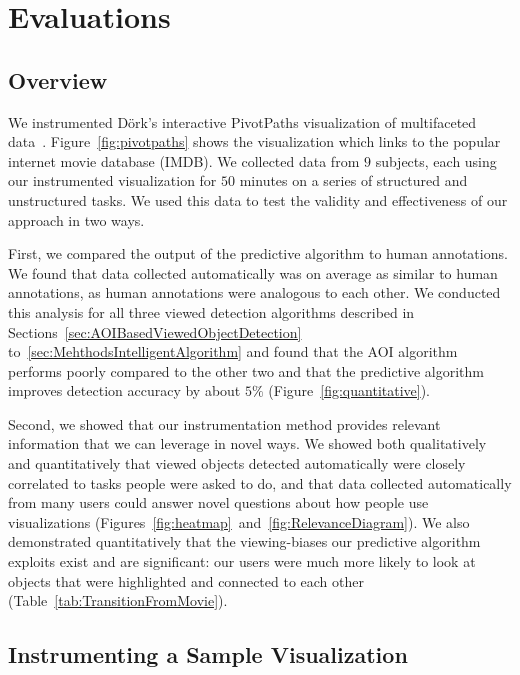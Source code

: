 \section{Evaluations}
\label{sec:DOICollectionEvaluation}

\subsection{Overview}
We instrumented D{\"o}rk's interactive PivotPaths visualization of multifaceted data~\cite{Dor12}. Figure~\ref{fig:pivotpaths} shows the visualization which links to the popular internet movie database (IMDB). We collected data from $9$ subjects, each using our instrumented visualization for $50$ minutes on a series of structured and unstructured tasks. We used this data to test the validity and effectiveness of our approach in two ways. 

First, we compared the output of the predictive algorithm to human annotations. We found that data collected automatically was on average as similar to human annotations, as human annotations were analogous to each other. We conducted this analysis for all three viewed detection algorithms described in Sections~\ref{sec:AOIBasedViewedObjectDetection} to~\ref{sec:MehthodsIntelligentAlgorithm} and found that the AOI algorithm performs poorly compared to the other two and that the predictive algorithm improves detection accuracy by about $5\%$  (Figure~\ref{fig:quantitative}). 

Second, we showed that our instrumentation method provides relevant information that we can leverage in novel ways. We showed both qualitatively and quantitatively that viewed objects detected automatically were closely correlated to tasks people were asked to do, and that data collected automatically from many users could answer novel questions about how people use visualizations (Figures~\ref{fig:heatmap}~and~\ref{fig:RelevanceDiagram}).    We also demonstrated quantitatively that the viewing-biases our predictive algorithm exploits exist and are significant: our users were much more likely to look at objects that were highlighted and connected to each other (Table~\ref{tab:TransitionFromMovie}).


\subsection{Instrumenting a Sample Visualization}
\label{sec:InstrumentingVisualization}

